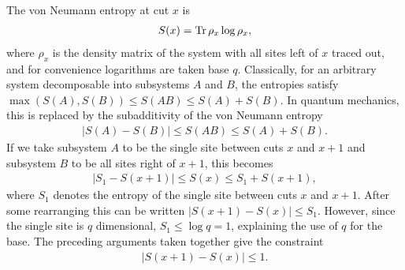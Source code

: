 The von Neumann entropy at cut $x$ is
\begin{align}
S(x) = \-\operatorname{Tr}\rho_x\log\rho_x, \label{eqn:vonneu}
\end{align}
where $\rho_x$ is the density matrix of the system with all sites left of $x$ traced out, and for convenience logarithms are taken base $q$. Classically, for an arbitrary system decomposable into subsystems $A$ and $B$, the entropies satisfy $\max(S(A), S(B)) \leq S(AB)\leq S(A) + S(B)$. In quantum mechanics, this is replaced by the subadditivity of the von Neumann entropy 
\begin{align}
\left|S(A)-S(B)\right| \leq S(AB)\leq S(A) + S(B). \label{eqn:subadd}
\end{align}
If we take subsystem $A$ to be the single site between cuts $x$ and $x+1$ and subsystem $B$ to be all sites right of $x+1$, this becomes
\begin{align}
\left|S_1 - S(x+1)\right| \leq S(x) \leq S_1 + S(x+1),
\end{align}
where $S_1$ denotes the entropy of the single site between cuts $x$ and $x+1$. After some rearranging this can be written $\left|S(x+1) - S(x)\right| \leq S_1$. However, since the single site is $q$ dimensional, $S_1 \leq \log q = 1$, explaining the use of $q$ for the base. The preceding arguments taken together give the constraint
\begin{align}
\left|S(x+1) - S(x)\right| \leq 1. \label{eqn:offbyone}
\end{align}
